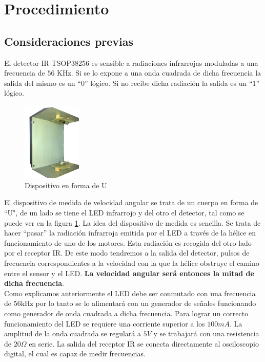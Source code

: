 \documentclass[main]{subfiles}
\begin{document}
\section{Procedimiento}


\subsection{Consideraciones previas}

El detector IR TSOP38256 es sensible a radiaciones infrarrojas moduladas a una frecuencia de $56$ KHz. Si se lo expone a una onda cuadrada de dicha frecuencia la salida del mismo es un ``0'' l\'ogico. Si no recibe dicha radiaci\'on la salida es un ``1'' l\'ogico.\\
\begin{figure}
  \begin{center}
    \includegraphics[width=0.25\textwidth]{./pics_motores/u.jpg}
  \end{center}
  \caption{Dispositivo en forma de U}
  \label{fig:u}
\end{figure}
El dispositivo de medida de velocidad angular se trata de un cuerpo en forma de ``U", de un lado se tiene el LED infrarrojo y del otro el detector, tal como se puede ver en la figura \ref{fig:u}.
La idea del dispositivo de medida es sencilla. Se trata de hacer ``pasar'' la radiaci\'on infrarroja emitida por el LED a trav\'es de la h\'elice en funcionamiento de uno de los motores. Esta radiaci\'on es recogida del otro lado por el receptor IR. De este modo tendremos a la salida del detector, pulsos de frecuencia correspondientes a la velocidad con la que la h\'elice obstruye el camino entre el sensor y el LED. \textbf{La velocidad angular ser\'a entonces la mitad de dicha frecuencia}.\\

Como explicamos anteriormente el LED debe ser conmutado con una frecuencia de 56kHz por lo tanto se lo alimentar\'a con un generador de se\~nales funcionando como generador de onda cuadrada a dicha frecuencia. Para lograr un correcto funcionamiento del LED se requiere una corriente superior a los $100mA$. La amplitud de la onda cuadrada se regular\'a a $5V$ y se trabajar\'a con una resistencia de $20\Omega$ en serie. La salida del receptor IR se conecta directamente al osciloscopio digital, el cual es capaz de medir frecuencias.\\
\end{document}
